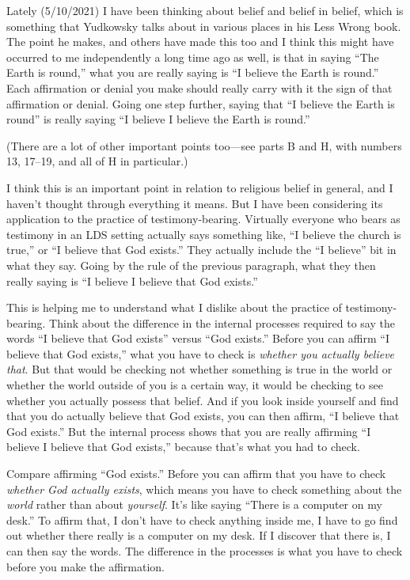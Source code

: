 		Lately (5/10/2021) I have been thinking about belief and belief in belief, which is something that Yudkowsky talks about in various places in his Less Wrong book. The point he makes, and others have made this too and I think this might have occurred to me independently a long time ago as well, is that in saying ``The Earth is round,'' what you are really saying is ``I believe the Earth is round.'' Each affirmation or denial you make should really carry with it the sign of that affirmation or denial. Going one step further, saying that ``I believe the Earth is round'' is really saying ``I believe I believe the Earth is round.''
		
		(There are a lot of other important points too---see parts B and H, with numbers 13, 17--19, and all of H in particular.)
		
		I think this is an important point in relation to religious belief in general, and I haven't thought through everything it means. But I have been considering its application to the practice of testimony-bearing. Virtually everyone who bears as testimony in an LDS setting actually says something like, ``I believe the church is true,'' or ``I believe that God exists.'' They actually include the ``I believe'' bit in what they say. Going by the rule of the previous paragraph, what they then really saying is ``I believe I believe that God exists.''
		
		This is helping me to understand what I dislike about the practice of testimony-bearing. Think about the difference in the internal processes required to say the words ``I believe that God exists'' versus ``God exists.'' Before you can affirm ``I believe that God exists,'' what you have to check is \textit{whether you actually believe that}. But that would be checking not whether something is true in the world or whether the world outside of you is a certain way, it would be checking to see whether you actually possess that belief. And if you look inside yourself and find that you do actually believe that God exists, you can then affirm, ``I believe that God exists.'' But the internal process shows that you are really affirming ``I believe I believe that God exists,'' because that's what you had to check.
		
		Compare affirming ``God exists.'' Before you can affirm that you have to check \textit{whether God actually exists}, which means you have to check something about the \textit{world} rather than about \textit{yourself}. It's like saying ``There is a computer on my desk.'' To affirm that, I don't have to check anything inside me, I have to go find out whether there really is a computer on my desk. If I discover that there is, I can then say the words. The difference in the processes is what you have to check before you make the affirmation.
		
